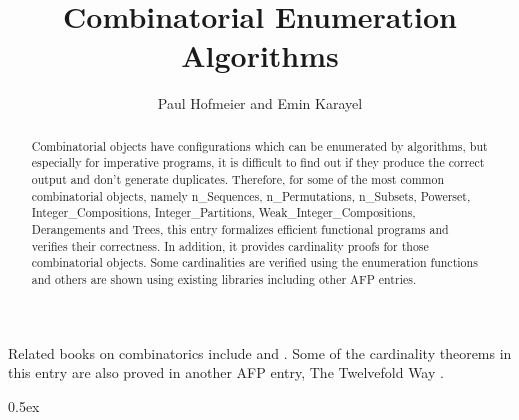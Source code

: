 \documentclass[11pt,a4paper]{article}
\begin{document}
\title{Combinatorial Enumeration Algorithms}
\author{Paul Hofmeier and Emin Karayel}
\maketitle

\begin{abstract}
Combinatorial objects have configurations which can be enumerated by algorithms,
but especially for imperative programs, it is difficult to find out if they produce the
correct output and don't generate duplicates. Therefore, for some of the most common
combinatorial objects, namely n\_Sequences, n\_Permutations, n\_Subsets, Powerset,
Integer\_Compositions, Integer\_Partitions, Weak\_Integer\_Compositions, Derangements and Trees, this
entry formalizes efficient functional programs and verifies their correctness.
In addition, it provides cardinality proofs for those combinatorial objects.
Some cardinalities are verified using the enumeration functions and others are
shown using existing libraries including other AFP entries.
\end{abstract}

Related books on combinatorics include \cite{stanleyenumerative} and
\cite{stantonwhite}. 
Some of the cardinality theorems in this entry are also proved in another 
AFP entry, The Twelvefold Way \cite{AFPtwel}. 

\tableofcontents

\parindent 0pt\parskip 0.5ex





\end{document}
